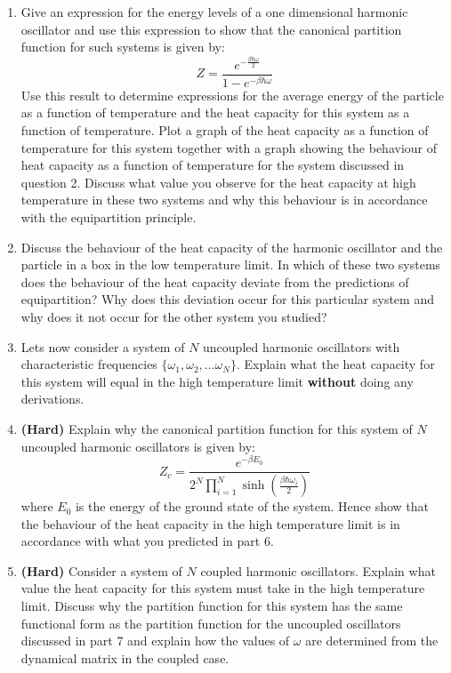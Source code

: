 \documentclass[a4paper]{article}
\begin{document}
\begin{enumerate}
\item Give an expression for the energy levels of a one dimensional harmonic oscillator and use this expression to show that the canonical partition function for such systems is given by:
$$
Z  = \frac{ e^{-\frac{\beta \hbar \omega}{2}} }{ 1 - e^{-\beta \hbar \omega} }
$$
Use this result to determine expressions for the average energy of the particle as a function of temperature and the heat capacity for this system as a function of temperature.  Plot a graph of the heat capacity as a function of temperature for this system together with a graph showing the behaviour of heat capacity as a function of temperature for the system discussed in question 2.  Discuss what value you observe for the heat capacity at high temperature in these two systems and why this behaviour is in accordance with the equipartition principle.

\item Discuss the behaviour of the heat capacity of the harmonic oscillator and the particle in a box in the low temperature limit.  In which of these two systems does the behaviour of the heat capacity deviate from the predictions of equipartition?  Why does this deviation occur for this particular system and why does it not occur for the other system you studied?  

\item Lets now consider a system of $N$ uncoupled harmonic oscillators with characteristic frequencies $\{ \omega_1, \omega_2, \dots \omega_N\}$.  Explain what the heat capacity for this system will equal in the high temperature limit {\bf without} doing any derivations.

\item {\bf (Hard)} Explain why the canonical partition function for this system of $N$ uncoupled harmonic oscillators is given by:
$$
Z_c = \frac{e^{-\beta E_0}}{2^N \prod_{i=1}^N \sinh\left( \frac{\beta \hbar \omega_i}{2} \right)}
$$      
where $E_0$ is the energy of the ground state of the system.  Hence show that the behaviour of the heat capacity in the high temperature limit is in accordance with what you predicted in part 6.

\item {\bf (Hard)} Consider a system of $N$ coupled harmonic oscillators.  Explain what value the heat capacity for this system must take in the high temperature limit.  Discuss why the partition function for this system has the same functional form as the partition function for the uncoupled oscillators discussed in part 7 and explain how the values of $\omega$ are determined from the dynamical matrix in the coupled case.


\end{enumerate}
\end{document}
